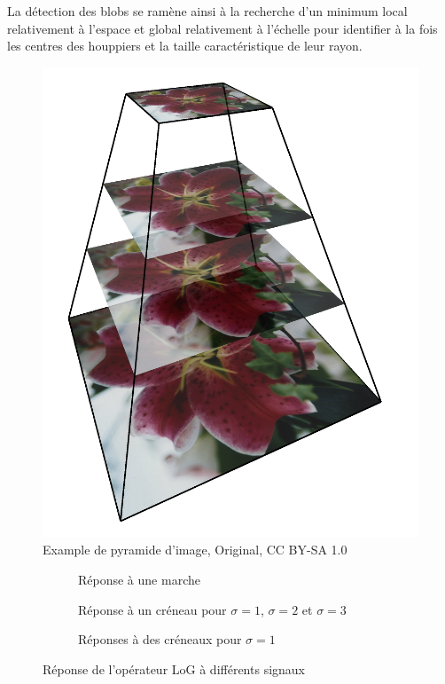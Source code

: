 \documentclass{article}
\begin{document}
	La détection des blobs se ramène ainsi à la recherche d'un minimum local relativement à l'espace et global relativement à l'échelle pour identifier à la fois les centres des houppiers et la taille caractéristique de leur rayon. 

\begin{figure}
	\centering
	\includegraphics[scale=0.15]{img.png}
	\caption{Example de pyramide d'image, Original, CC BY-SA 1.0}
	\label{fig:ex}
\end{figure}

\begin{figure}
	\begin{subfigure}{.5\textwidth}
		\scalebox{0.3}{}
		\caption{Réponse à une marche}
	\end{subfigure}
	\begin{subfigure}{.5\textwidth}
		\scalebox{0.3}{}
		\caption{Réponse à un créneau pour $\sigma=1$, $\sigma=2$ et $\sigma=3$ }
	\end{subfigure}
	\begin{subfigure}{.5\textwidth}
		\scalebox{0.3}{}
		\caption{Réponses à des créneaux pour $\sigma=1$}
	\end{subfigure}
	\caption{Réponse de l'opérateur LoG à différents signaux}
	\label{fig:graph}
\end{figure}
\end{document}
